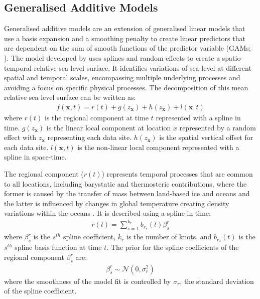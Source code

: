 \subsection{Generalised Additive Models}\label{generalisedadditivemodels}

Generalised additive models are an extension of generalised linear models that use a basis expansion and a smoothing penalty to create linear predictors that are dependent on the sum of smooth functions of the predictor variable (GAMs; \citep{wood_2017}). The model developed by \citet{Upton2023noisy} uses splines and random effects to create a spatio-temporal relative sea level surface. It identifies variations of sea-level at different spatial and temporal scales, encompassing multiple underlying processes and avoiding a focus on specific physical processes. The decomposition of this mean relative sea level surface can be written as:
\begin{align}
f(\mathbf{x},t) =  r(t)+ g(z_\mathbf{x}) + h(z_\mathbf{x}) + l(\mathbf{x},t)
    \end{align}
where \(r(t)\) is the regional component at time \(t\) represented with a spline in time. \(g(z_{\mathbf{x}})\) is the linear local component at location \(x\) represented by a random effect with \(z_{\mathbf{x}}\) representing each data site. \(h(z_\mathbf{x})\) is the spatial vertical offset for each data site. \(l(\mathbf{x},t)\) is the non-linear local component represented with a spline in space-time.

The regional component (\(r(t)\)) represents temporal processes that are common to all locations, including barystatic and thermosteric contributions, where the former is caused by the transfer of mass between land-based ice and oceans \citep{Gregory2019} and the latter is influenced by changes in global temperature creating density variations within the oceans \citep{Grinsted2015}. It is described using a spline in time:
\begin{align}
r(t) = \sum^{k_r}_{s=1} b_{r_s}(t)\beta^{r}_s
\end{align}
where \(\beta^{r}_s\) is the \(s^{th}\) spline coefficient, \(k_r\) is the number of knots, and \(b_{r_s}(t)\) is the \(s^{th}\) spline basis function at time \(t\). The prior for the spline coefficients of the regional component \(\beta^{r}_s\) are:
\begin{align}
  \beta^{r}_s \sim \mathcal{N} ( 0, \sigma_r^2)
\end{align}
where the smoothness of the model fit is controlled by \(\sigma_r\), the standard deviation of the spline coefficient.

